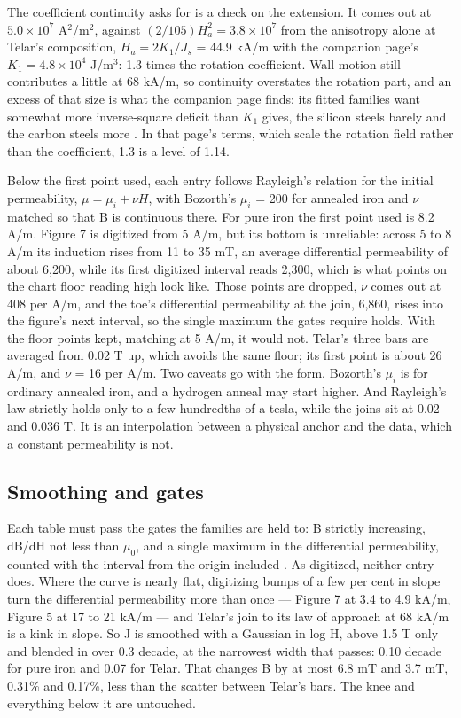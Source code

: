 \documentclass[
  11pt,
]{article}
\begin{document}
The coefficient continuity asks for is a check on the extension. It comes out at \(5.0\times10^{7}\) A\(^2\)/m\(^2\), against \((2/105)H_a^{2} = 3.8\times10^{7}\) from the anisotropy alone at Telar's composition, \(H_a = 2K_1/J_s\) = 44.9 kA/m with the companion page's \(K_1 = 4.8\times10^{4}\) J/m\(^3\): 1.3 times the rotation coefficient. Wall motion still contributes a little at 68 kA/m, so continuity overstates the rotation part, and an excess of that size is what the companion page finds: its fitted families want somewhat more inverse-square deficit than \(K_1\) gives, the silicon steels barely and the carbon steels more \cite{meeker-lowcarbon}. In that page's terms, which scale the rotation field rather than the coefficient, 1.3 is a level of 1.14.

Below the first point used, each entry follows Rayleigh's relation for the initial permeability, \(\mu = \mu_i + \nu H\), with Bozorth's \(\mu_i\) = 200 for annealed iron \cite{bozorth1951} and \(\nu\) matched so that B is continuous there. For pure iron the first point used is 8.2 A/m. Figure 7 is digitized from 5 A/m, but its bottom is unreliable: across 5 to 8 A/m its induction rises from 11 to 35 mT, an average differential permeability of about 6,200, while its first digitized interval reads 2,300, which is what points on the chart floor reading high look like. Those points are dropped, \(\nu\) comes out at 408 per A/m, and the toe's differential permeability at the join, 6,860, rises into the figure's next interval, so the single maximum the gates require holds. With the floor points kept, matching at 5 A/m, it would not. Telar's three bars are averaged from 0.02 T up, which avoids the same floor; its first point is about 26 A/m, and \(\nu\) = 16 per A/m. Two caveats go with the form. Bozorth's \(\mu_i\) is for ordinary annealed iron, and a hydrogen anneal may start higher. And Rayleigh's law strictly holds only to a few hundredths of a tesla, while the joins sit at 0.02 and 0.036 T. It is an interpolation between a physical anchor and the data, which a constant permeability is not.

\subsection{Smoothing and gates}\label{smoothing-and-gates}

Each table must pass the gates the families are held to: B strictly increasing, dB/dH not less than \(\mu_0\), and a single maximum in the differential permeability, counted with the interval from the origin included \cite{meeker-lowcarbon}. As digitized, neither entry does. Where the curve is nearly flat, digitizing bumps of a few per cent in slope turn the differential permeability more than once --- Figure 7 at 3.4 to 4.9 kA/m, Figure 5 at 17 to 21 kA/m --- and Telar's join to its law of approach at 68 kA/m is a kink in slope. So J is smoothed with a Gaussian in log H, above 1.5 T only and blended in over 0.3 decade, at the narrowest width that passes: 0.10 decade for pure iron and 0.07 for Telar. That changes B by at most 6.8 mT and 3.7 mT, 0.31\% and 0.17\%, less than the scatter between Telar's bars. The knee and everything below it are untouched.
\end{document}
